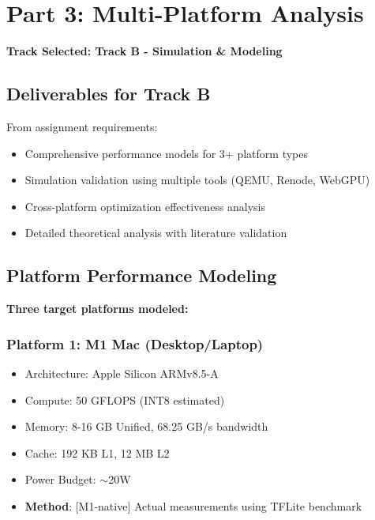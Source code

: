 \documentclass[10pt, a4paper]{article}
\begin{document}
\section*{Part 3: Multi-Platform Analysis}

\textbf{Track Selected: Track B - Simulation \& Modeling}

\subsection{Deliverables for Track B}

From assignment requirements:
\begin{itemize}
    \item Comprehensive performance models for 3+ platform types
    \item Simulation validation using multiple tools (QEMU, Renode, WebGPU)
    \item Cross-platform optimization effectiveness analysis
    \item Detailed theoretical analysis with literature validation
\end{itemize}

\subsection{Platform Performance Modeling}

\textbf{Three target platforms modeled:}

\subsubsection{Platform 1: M1 Mac (Desktop/Laptop)}
\begin{itemize}
    \item Architecture: Apple Silicon ARMv8.5-A
    \item Compute: 50 GFLOPS (INT8 estimated)
    \item Memory: 8-16 GB Unified, 68.25 GB/s bandwidth
    \item Cache: 192 KB L1, 12 MB L2
    \item Power Budget: $\sim$20W
    \item \textbf{Method}: [M1-native] Actual measurements using TFLite benchmark
\end{itemize}
\end{document}
